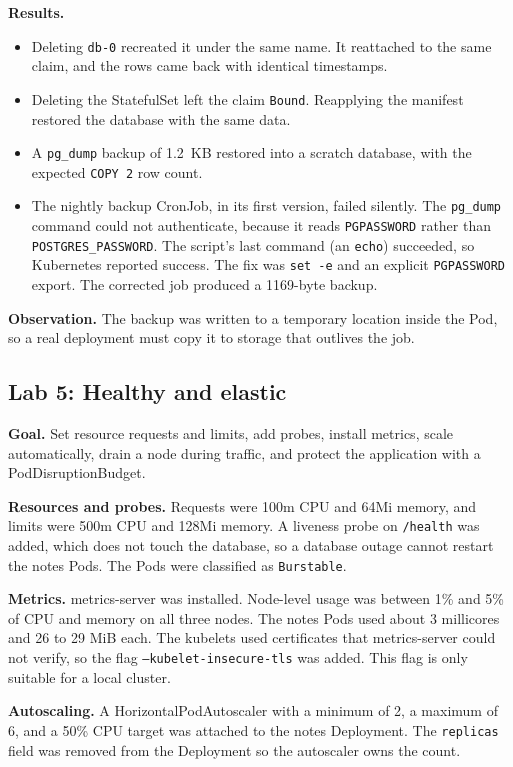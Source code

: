 \documentclass[11pt,a4paper]{article}
\begin{document}
\textbf{Results.}
\begin{itemize}[leftmargin=*]
  \item Deleting \texttt{db-0} recreated it under the same name. It reattached to the same claim, and the rows came back with identical timestamps.
  \item Deleting the StatefulSet left the claim \texttt{Bound}. Reapplying the manifest restored the database with the same data.
  \item A \texttt{pg\_dump} backup of 1.2~KB restored into a scratch database, with the expected \texttt{COPY 2} row count.
  \item The nightly backup CronJob, in its first version, failed silently. The \texttt{pg\_dump} command could not authenticate, because it reads \texttt{PGPASSWORD} rather than \texttt{POSTGRES\_PASSWORD}. The script's last command (an \texttt{echo}) succeeded, so Kubernetes reported success. The fix was \texttt{set -e} and an explicit \texttt{PGPASSWORD} export. The corrected job produced a 1169-byte backup.
\end{itemize}

\textbf{Observation.} The backup was written to a temporary location inside the Pod, so a real deployment must copy it to storage that outlives the job.

\subsection{Lab 5: Healthy and elastic}
\textbf{Goal.} Set resource requests and limits, add probes, install metrics, scale automatically, drain a node during traffic, and protect the application with a PodDisruptionBudget.

\textbf{Resources and probes.} Requests were 100m CPU and 64Mi memory, and limits were 500m CPU and 128Mi memory. A liveness probe on \texttt{/health} was added, which does not touch the database, so a database outage cannot restart the notes Pods. The Pods were classified as \texttt{Burstable}.

\textbf{Metrics.} metrics-server was installed. Node-level usage was between 1\% and 5\% of CPU and memory on all three nodes. The notes Pods used about 3 millicores and 26 to 29 MiB each. The kubelets used certificates that metrics-server could not verify, so the flag \texttt{--kubelet-insecure-tls} was added. This flag is only suitable for a local cluster.

\textbf{Autoscaling.} A HorizontalPodAutoscaler with a minimum of 2, a maximum of 6, and a 50\% CPU target was attached to the notes Deployment. The \texttt{replicas} field was removed from the Deployment so the autoscaler owns the count.
\end{document}
